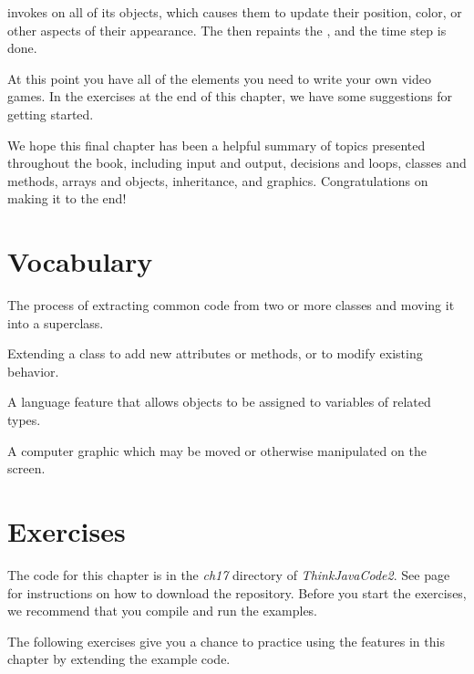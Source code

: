  invokes  on all of its  objects, which causes them to update their position, color, or other aspects of their appearance.
The  then repaints the , and the time step is done.

At this point you have all of the elements you need to write your own video games.
In the exercises at the end of this chapter, we have some suggestions for getting started.

We hope this final chapter has been a helpful summary of topics presented throughout the book, including input and output, decisions and loops, classes and methods, arrays and objects, inheritance, and graphics.
Congratulations on making it to the end!


\section{Vocabulary}

\begin{description}

The process of extracting common code from two or more classes and moving it into a superclass.

Extending a class to add new attributes or methods, or to modify existing behavior.

A language feature that allows objects to be assigned to variables of related types.

A computer graphic which may be moved or otherwise manipulated on the screen.

\end{description}


\section{Exercises}


The code for this chapter is in the {\it ch17} directory of {\it ThinkJavaCode2}.
See page~\pageref{code} for instructions on how to download the repository.
Before you start the exercises, we recommend that you compile and run the examples.

The following exercises give you a chance to practice using the features in this chapter by extending the example code.


